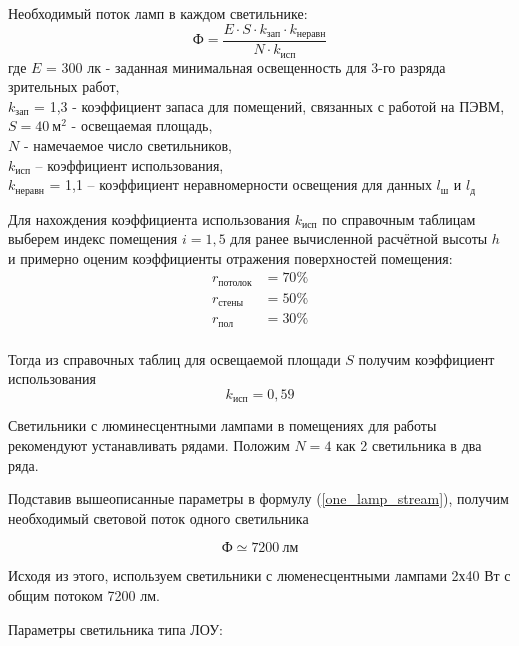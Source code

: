 Необходимый поток ламп в каждом светильнике:
\begin{equation}
\label{one_lamp_stream}
    \text{Ф} = \frac{E \cdot S \cdot k_\text{зап} \cdot k_\text{неравн}}{N \cdot k_\text{исп}}
\end{equation}
где $E$ = 300 лк - заданная минимальная освещенность для 3-го разряда зрительных работ, \\
$k_\text{зап}$ = 1,3 - коэффициент запаса для помещений, связанных с работой на ПЭВМ,   \\
$S = 40 ~\text{м}^2$ - освещаемая площадь,                                              \\
$N$ - намечаемое число светильников,                                                    \\
$k_\text{исп}$ – коэффициент использования,                                             \\
$k_\text{неравн}$ = 1,1 – коэффициент неравномерности освещения для данных $l_\text{ш}$ и
$l_\text{д}$

Для нахождения коэффициента использования $k_\text{исп}$ по справочным таблицам
выберем индекс помещения $i = 1,5$ для ранее вычисленной расчётной высоты $h$ и
примерно оценим коэффициенты отражения поверхностей помещения:
\begin{equation}
    \begin{array}{ll}
        r_\text{потолок}    & = 70\% \\
        r_\text{стены}      & = 50\% \\
        r_\text{пол}        & = 30\% \\
    \end{array}
    \label{reflection_coeff}
\end{equation}

Тогда из справочных таблиц для освещаемой площади $S$ получим коэффициент использования
$$
    k_\text{исп} = 0,59
$$

Светильники с люминесцентными лампами в помещениях для работы рекомендуют
устанавливать рядами. Положим $N = 4$ как 2 светильника в два ряда.

Подставив вышеописанные параметры в формулу (\ref{one_lamp_stream}), получим
необходимый световой поток одного светильника

$$
    \text{Ф} \simeq 7200 ~\text{лм}
$$

Исходя из этого, используем светильники с люменесцентными лампами 2х40 Вт с
общим потоком 7200 лм.

Параметры светильника типа ЛОУ:

